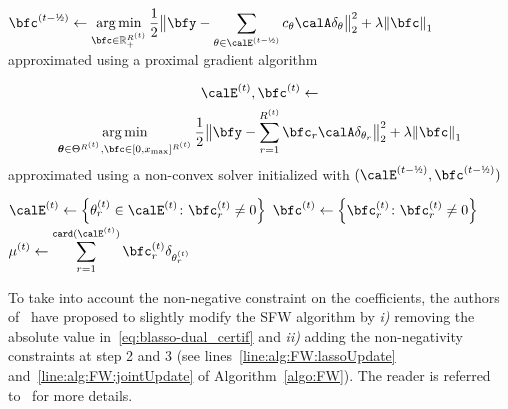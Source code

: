 \begin{algorithm}
{        \myspace
		$
		\displaystyle
		\vcoeffIt{t-\text{\textonehalf}} \leftarrow \kargmin_{\bfc\in\kR_+^{R^{(t)}}} \frac{1}{2} \big\Vert{\bfy - \sum_{\theta\in\ThetaIt{t-\text{\textonehalf}}} c_\theta \opObs\spike{\theta}}\big\Vert_2^2 + \lambda\kvvbar{\bfc}_1$
		approximated using a proximal gradient algorithm
		\label{line:alg:FW:lassoUpdate} \;

        \myspace
		{
		\setlength{\abovedisplayskip}{-1.5em}
		\begin{multline*}
		\ThetaIt{t},\vcoeffIt{t} \leftarrow \\ \kargmin_{\boldsymbol{\theta}\in\Theta^{R^{(t)}},\bfc\in[0, x_{\max}]^{R^{(t)}}} \frac{1}{2} \big\Vert{\bfy - \sum_{r=1}^{R^{(t)}} \bfc_r \opObs\spike{\theta_r}}\big\Vert_2^2 + \lambda\kvvbar{\bfc}_1
		\end{multline*}
		approximated using a non-convex solver initialized with $(\ThetaIt{t-\text{\textonehalf}},\bfc^{(t-\text{\textonehalf})})$
		\label{line:alg:FW:jointUpdate} \;
        }

        \myspace
		$\ThetaIt{t}\leftarrow \kset{\thetaIt{t}_r\in\ThetaIt{t}}{\vcoeffIt{t}_r\neq0}$ \;
		$\vcoeffIt{t} \leftarrow \kset{\vcoeffIt{t}_r}{\vcoeffIt{t}_r\neq0}$ \;
		$\displaystyle\muIt{t} \leftarrow \sum_{r=1}^{\texttt{card}(\ThetaIt{t})} \vcoeffIt{t}_r \delta_{\thetaIt{t}_r}$ \;
	}
\end{algorithm}


To take into account the non-negative constraint on the coefficients, the authors of~ have proposed to slightly modify the SFW algorithm by \textit{i)} removing the absolute value in~\eqref{eq:blasso-dual_certif} and \textit{ii)} adding the non-negativity constraints at step 2 and 3 (see lines~\ref{line:alg:FW:lassoUpdate} and~\ref{line:alg:FW:jointUpdate} of Algorithm~\ref{algo:FW}).
The reader is referred to~ for more details.

